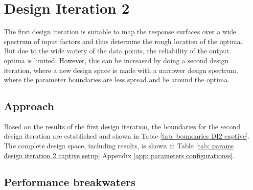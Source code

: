 
\section{Design Iteration 2}
\label{sec: design iteration 2 captive}
The first design iteration is suitable to map the response surfaces over a wide spectrum of input factors and thus determine the rough location of the optima. But due to the wide variety of the data points, the reliability of the output optima is limited. However, this can be increased by doing a second design iteration, where a new design space is made with a narrower design spectrum, where the parameter boundaries are less spread and lie around the optima.

\subsection{Approach}
Based on the results of the first design iteration, the boundaries for the second design iteration are established and shown in Table \ref{tab: boundaries DI2 captive}. The complete design space, including results, is shown in Table \ref{tab: params design iteration 2 captive setup} Appendix \ref{app: parameters configurationss}.

\begin{table}[h]
\centering
{}
\caption{Boundaries Design Space Captive Design Iteration 2}
\label{tab: boundaries DI2 captive}
\end{table}

\subsection{Performance breakwaters}
\label{sec: DI1 captive H3 performance bw}

